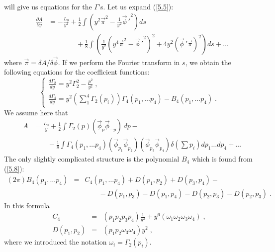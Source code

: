 \documentclass[a4paper,12pt]{article}
\numberwithin{equation}{section}
\newcommand{\dis}{\displaystyle}
\begin{document}
 will give us equations for the \( \Gamma  \)'s. Let us expand (\ref{5.5}):
\begin{eqnarray}
 & \dis \frac{\partial A}{\partial y} & =-\frac{L_{0}}{y^{2}}+\frac{1}{2}\int \left( y^{2}\vec{\pi }^{2}-\frac{1}{y^{2}}{\vec{\phi }\, '}^{2}\right) ds\nonumber \\
 &  & \qquad \qquad +\frac{1}{8}\int \left( \frac{1}{y^{2}}\left( y^{4}\vec{\pi }^{2}-{\vec{\phi }\, '}^{2}\right) ^{2}+4y^{2}\left( \vec{\phi }\, '\vec{\pi }\right) ^{2}\right) ds+\ldots \label{5.8} 
\end{eqnarray}
 where \( \vec{\pi }=\delta A/\delta \vec{\phi } \). If we perform the Fourier
transform in \( s \), we obtain the following equations for the coefficient
functions:
\begin{equation}
\label{5.9}
\left\{ \begin{array}{l}
\dis \frac{d\Gamma _{2}}{dy}=y^{2}\Gamma ^{2}_{2}-\frac{p^{2}}{y^{2}}\; ,\\
\dis \frac{d\Gamma _{4}}{dy}=y^{2}\left( \sum _{1}^{4}\Gamma _{2}(p_{i})\right) \Gamma _{4}(p_{1},\ldots p_{4})-B_{4}(p_{1},\ldots p_{4})\; .
\end{array}\right. 
\end{equation}
 We assume here that
\begin{eqnarray}
 & A & =\frac{L_{0}}{y}+\frac{1}{2}\int \Gamma _{2}(p)\left( \vec{\phi }_{p}\vec{\phi }_{-p}\right) \, dp-\label{5.10} \\
 &  & \qquad -\frac{1}{8}\int \Gamma _{4}(p_{1},\ldots p_{4})\left( \vec{\phi }_{p_{1}}\vec{\phi }_{p_{2}}\right) \left( \vec{\phi }_{p_{3}}\vec{\phi }_{p_{4}}\right) \delta \left( \sum p_{i}\right) dp_{1}\ldots dp_{4}+\ldots \nonumber 
\end{eqnarray}
 The only slightly complicated structure is the polynomial \( B_{4} \) which
is found from (\ref{5.8}):
\begin{eqnarray}
(2\pi )B_{4}(p_{1},\ldots p_{4}) & = & C_{4}(p_{1},\ldots p_{4})+D(p_{1},p_{2})+D(p_{3},p_{4})-\nonumber \\
 &  & \qquad -D(p_{1},p_{3})-D(p_{1},p_{4})-D(p_{2},p_{3})-D(p_{2},p_{3})\; .\label{5.11} 
\end{eqnarray}
 In this formula 
\begin{eqnarray}
C_{4} & = & \left( p_{1}p_{2}p_{3}p_{4}\right) \frac{1}{y^{2}}+y^{6}\left( \omega _{1}\omega _{2}\omega _{3}\omega _{4}\right) \; ,\nonumber \\
D(p_{1},p_{2}) & = & (p_{1}p_{2}\omega _{3}\omega _{4})y^{2}\; ,\nonumber \label{5.12} 
\end{eqnarray}
 where we introduced the notation \( \omega _{i}=\Gamma _{2}(p_{i}) \).
\end{document}
